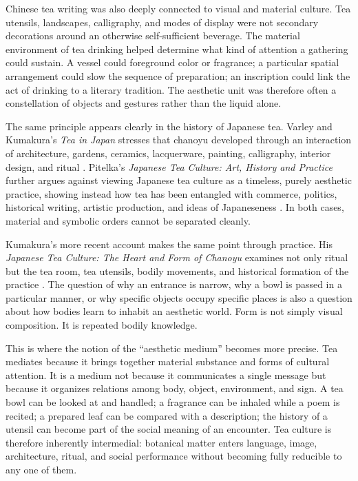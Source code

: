 \documentclass[numbers]{IntechOpen-Book}
\begin{document}
Chinese tea writing was also deeply connected to visual and material culture. Tea utensils, landscapes, calligraphy, and modes of display were not secondary decorations around an otherwise self-sufficient beverage. The material environment of tea drinking helped determine what kind of attention a gathering could sustain. A vessel could foreground color or fragrance; a particular spatial arrangement could slow the sequence of preparation; an inscription could link the act of drinking to a literary tradition. The aesthetic unit was therefore often a constellation of objects and gestures rather than the liquid alone.

The same principle appears clearly in the history of Japanese tea. Varley and Kumakura's \textit{Tea in Japan} stresses that chanoyu developed through an interaction of architecture, gardens, ceramics, lacquerware, painting, calligraphy, interior design, and ritual \cite{varleykumakura1989}. Pitelka's \textit{Japanese Tea Culture: Art, History and Practice} further argues against viewing Japanese tea culture as a timeless, purely aesthetic practice, showing instead how tea has been entangled with commerce, politics, historical writing, artistic production, and ideas of Japaneseness \cite{pitelka2013}. In both cases, material and symbolic orders cannot be separated cleanly.

Kumakura's more recent account makes the same point through practice. His \textit{Japanese Tea Culture: The Heart and Form of Chanoyu} examines not only ritual but the tea room, tea utensils, bodily movements, and historical formation of the practice \cite{kumakura2023}. The question of why an entrance is narrow, why a bowl is passed in a particular manner, or why specific objects occupy specific places is also a question about how bodies learn to inhabit an aesthetic world. Form is not simply visual composition. It is repeated bodily knowledge.

This is where the notion of the ``aesthetic medium'' becomes more precise. Tea mediates because it brings together material substance and forms of cultural attention. It is a medium not because it communicates a single message but because it organizes relations among body, object, environment, and sign. A tea bowl can be looked at and handled; a fragrance can be inhaled while a poem is recited; a prepared leaf can be compared with a description; the history of a utensil can become part of the social meaning of an encounter. Tea culture is therefore inherently intermedial: botanical matter enters language, image, architecture, ritual, and social performance without becoming fully reducible to any one of them.
\end{document}
